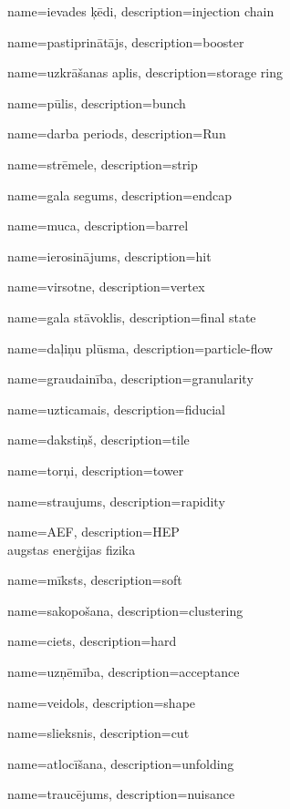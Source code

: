{
        name=ievades ķēdi,
        description={injection chain}
}

{
        name=pastiprinātājs,
        description={booster}
}

{
        name=uzkrāšanas aplis,
        description={storage ring}
}

{
        name=pūlis,
        description={bunch}
}

{
        name=darba periods,
        description={Run}
}

{
        name=strēmele,
        description={strip}
}

{
        name=gala segums,
        description={endcap}
}

{
        name=muca,
        description={barrel}
}

{
        name=ierosinājums,
        description={hit}
}

{
        name=virsotne,
        description={vertex}
}

{
        name=gala stāvoklis,
        description={final state}
}

{
        name=daļiņu plūsma,
        description={particle-flow}
}

{
        name=graudainība,
        description={granularity}
}

{
        name=uzticamais,
        description={fiducial}
}


{
        name=dakstiņš,
        description={tile}
}


{
        name=torņi,
        description={tower}
}


{
        name=straujums,
        description={rapidity}
}

{
        name=AEF,
        description={HEP\\
        augstas enerģijas fizika}
}

{
        name=mīksts,
        description={soft}
}

{
        name=sakopošana,
        description={clustering}
}

{
        name=ciets,
        description={hard}
}

{
        name=uzņēmība,
        description={acceptance}
}

{
        name=veidols,
        description={shape}
}

{
        name=slieksnis,
        description={cut}
}

{
        name=atlocīšana,
        description={unfolding}
}

{
        name=traucējums,
        description={nuisance}
}
